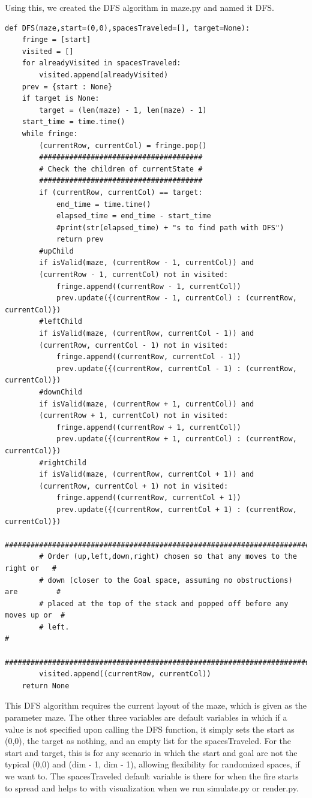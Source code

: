 \documentclass[11pt]{article}
\begin{document}
Using this, we created the DFS algorithm in maze.py and named it DFS.
\begin{verbatim}
def DFS(maze,start=(0,0),spacesTraveled=[], target=None):
    fringe = [start]
    visited = []
    for alreadyVisited in spacesTraveled:
        visited.append(alreadyVisited)
    prev = {start : None}
    if target is None:
        target = (len(maze) - 1, len(maze) - 1)
    start_time = time.time()
    while fringe:
        (currentRow, currentCol) = fringe.pop()
        ######################################
        # Check the children of currentState #
        ######################################
        if (currentRow, currentCol) == target:
            end_time = time.time()
            elapsed_time = end_time - start_time
            #print(str(elapsed_time) + "s to find path with DFS")
            return prev
        #upChild
        if isValid(maze, (currentRow - 1, currentCol)) and 
        (currentRow - 1, currentCol) not in visited:
            fringe.append((currentRow - 1, currentCol))
            prev.update({(currentRow - 1, currentCol) : (currentRow, currentCol)})
        #leftChild
        if isValid(maze, (currentRow, currentCol - 1)) and 
        (currentRow, currentCol - 1) not in visited:
            fringe.append((currentRow, currentCol - 1))
            prev.update({(currentRow, currentCol - 1) : (currentRow, currentCol)})
        #downChild
        if isValid(maze, (currentRow + 1, currentCol)) and 
        (currentRow + 1, currentCol) not in visited:
            fringe.append((currentRow + 1, currentCol))
            prev.update({(currentRow + 1, currentCol) : (currentRow, currentCol)})
        #rightChild
        if isValid(maze, (currentRow, currentCol + 1)) and 
        (currentRow, currentCol + 1) not in visited:
            fringe.append((currentRow, currentCol + 1))
            prev.update({(currentRow, currentCol + 1) : (currentRow, currentCol)})
        #########################################################################
        # Order (up,left,down,right) chosen so that any moves to the right or   #
        # down (closer to the Goal space, assuming no obstructions) are         # 
        # placed at the top of the stack and popped off before any moves up or  #
        # left.                                                                 #
        #########################################################################
        visited.append((currentRow, currentCol))
    return None
\end{verbatim}
This DFS algorithm requires the current layout of the maze, which is given as the parameter maze. The other three variables are default variables in which if a value is not specified upon calling the DFS function, it simply sets the start as (0,0), the target as nothing, and an empty list for the spacesTraveled. For the start and target, this is for any scenario in which the start and goal are not the typical (0,0) and (dim - 1, dim - 1), allowing flexibility for randomized spaces, if we want to. The spacesTraveled default variable is there for when the fire starts to spread and helps to with visualization when we run simulate.py or render.py.
\end{document}
